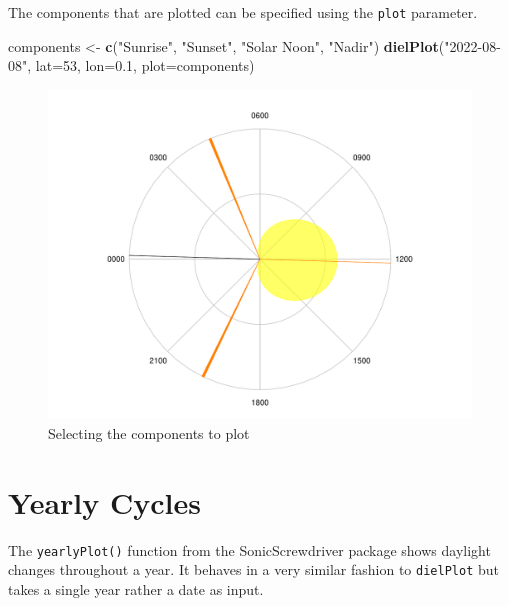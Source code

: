 \documentclass[
]{book}
\newenvironment{Shaded}{\begin{snugshade}}{\end{snugshade}}
\newcommand{\AttributeTok}[1]{\textcolor[rgb]{0.13,0.29,0.53}{#1}}
\newcommand{\DecValTok}[1]{\textcolor[rgb]{0.00,0.00,0.81}{#1}}
\newcommand{\FloatTok}[1]{\textcolor[rgb]{0.00,0.00,0.81}{#1}}
\newcommand{\FunctionTok}[1]{\textcolor[rgb]{0.13,0.29,0.53}{\textbf{#1}}}
\newcommand{\NormalTok}[1]{#1}
\newcommand{\OtherTok}[1]{\textcolor[rgb]{0.56,0.35,0.01}{#1}}
\newcommand{\StringTok}[1]{\textcolor[rgb]{0.31,0.60,0.02}{#1}}
\begin{document}
The components that are plotted can be specified using the \texttt{plot} parameter.

\begin{Shaded}
\begin{Highlighting}[]
\NormalTok{components }\OtherTok{\textless{}{-}} \FunctionTok{c}\NormalTok{(}\StringTok{"Sunrise"}\NormalTok{, }\StringTok{"Sunset"}\NormalTok{, }\StringTok{"Solar Noon"}\NormalTok{, }\StringTok{"Nadir"}\NormalTok{)}
\FunctionTok{dielPlot}\NormalTok{(}\StringTok{"2022{-}08{-}08"}\NormalTok{, }\AttributeTok{lat=}\DecValTok{53}\NormalTok{, }\AttributeTok{lon=}\FloatTok{0.1}\NormalTok{, }\AttributeTok{plot=}\NormalTok{components)}
\end{Highlighting}
\end{Shaded}

\begin{figure}

{\centering \includegraphics[width=0.9\linewidth]{_main_files/figure-latex/diel-plot-components-1} 

}

\caption{Selecting the components to plot}\label{fig:diel-plot-components}
\end{figure}

\hypertarget{yearly-cycles}{%
\section{Yearly Cycles}\label{yearly-cycles}}

The \texttt{yearlyPlot()} function from the SonicScrewdriver package shows daylight changes throughout a year. It behaves in a very similar fashion to \texttt{dielPlot} but takes a single year rather a date as input.
\end{document}
